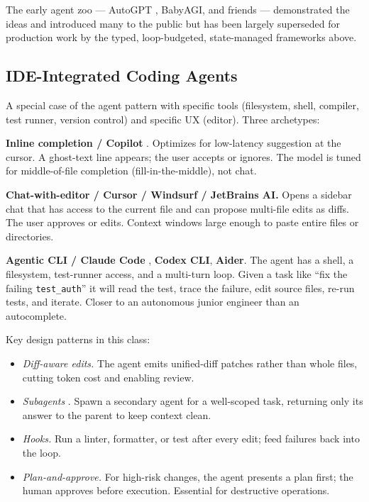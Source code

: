 The early agent zoo --- AutoGPT
\citep{significant_gravitas_autogpt}, BabyAGI, and friends ---
demonstrated the ideas and introduced many to the public but has
been largely superseded for production work by the typed,
loop-budgeted, state-managed frameworks above.

\subsection{IDE-Integrated Coding Agents}

A special case of the agent pattern with specific tools
(filesystem, shell, compiler, test runner, version control) and
specific UX (editor). Three archetypes:

\textbf{Inline completion / Copilot} \citep{github_copilot}.
Optimizes for low-latency suggestion at the cursor. A ghost-text
line appears; the user accepts or ignores. The model is tuned
for middle-of-file completion (fill-in-the-middle), not chat.

\textbf{Chat-with-editor / Cursor / Windsurf / JetBrains AI.}
Opens a sidebar chat that has access to the current file and can
propose multi-file edits as diffs. The user approves or edits.
Context windows large enough to paste entire files or directories.

\textbf{Agentic CLI / Claude Code} \citep{claude_code},
\textbf{Codex CLI}, \textbf{Aider}. The agent has a shell, a
filesystem, test-runner access, and a multi-turn loop. Given a
task like ``fix the failing \texttt{test\_auth}'' it will read
the test, trace the failure, edit source files, re-run tests,
and iterate. Closer to an autonomous junior engineer than an
autocomplete.

Key design patterns in this class:
\begin{itemize}
  \item \emph{Diff-aware edits.} The agent emits unified-diff
        patches rather than whole files, cutting token cost and
        enabling review.
  \item \emph{Subagents} \citep{claude_code}. Spawn a secondary
        agent for a well-scoped task, returning only its answer
        to the parent to keep context clean.
  \item \emph{Hooks.} Run a linter, formatter, or test after
        every edit; feed failures back into the loop.
  \item \emph{Plan-and-approve.} For high-risk changes, the
        agent presents a plan first; the human approves before
        execution. Essential for destructive operations.
\end{itemize}


